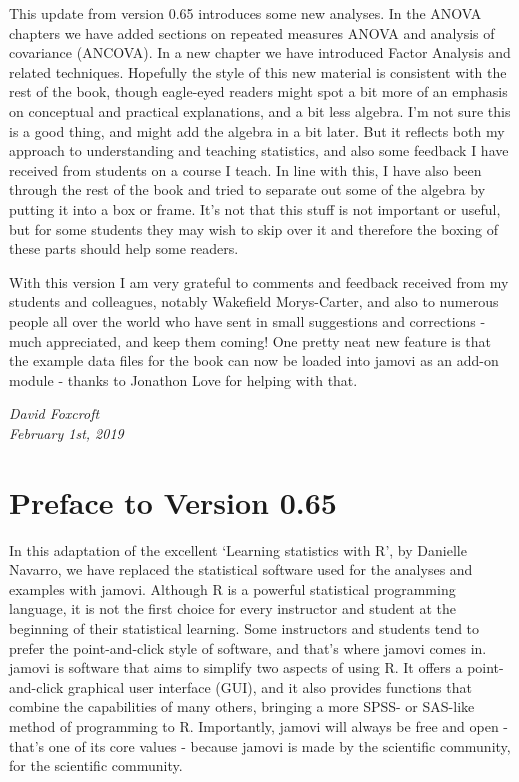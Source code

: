 \documentclass[
  letterpaper,
]{book}
\begin{document}
This update from version 0.65 introduces some new analyses. In the ANOVA
chapters we have added sections on repeated measures ANOVA and analysis
of covariance (ANCOVA). In a new chapter we have introduced Factor
Analysis and related techniques. Hopefully the style of this new
material is consistent with the rest of the book, though eagle-eyed
readers might spot a bit more of an emphasis on conceptual and practical
explanations, and a bit less algebra. I'm not sure this is a good thing,
and might add the algebra in a bit later. But it reflects both my
approach to understanding and teaching statistics, and also some
feedback I have received from students on a course I teach. In line with
this, I have also been through the rest of the book and tried to
separate out some of the algebra by putting it into a box or frame. It's
not that this stuff is not important or useful, but for some students
they may wish to skip over it and therefore the boxing of these parts
should help some readers.

With this version I am very grateful to comments and feedback received
from my students and colleagues, notably Wakefield Morys-Carter, and
also to numerous people all over the world who have sent in small
suggestions and corrections - much appreciated, and keep them coming!
One pretty neat new feature is that the example data files for the book
can now be loaded into jamovi as an add-on module - thanks to Jonathon
Love for helping with that.

\emph{David Foxcroft\\
February 1st, 2019}

\hypertarget{preface-to-version-0.65}{%
\section*{Preface to Version 0.65}\label{preface-to-version-0.65}}

In this adaptation of the excellent `Learning statistics with R', by
Danielle Navarro, we have replaced the statistical software used for the
analyses and examples with jamovi. Although R is a powerful statistical
programming language, it is not the first choice for every instructor
and student at the beginning of their statistical learning. Some
instructors and students tend to prefer the point-and-click style of
software, and that's where jamovi comes in. jamovi is software that aims
to simplify two aspects of using R. It offers a point-and-click
graphical user interface (GUI), and it also provides functions that
combine the capabilities of many others, bringing a more SPSS- or
SAS-like method of programming to R. Importantly, jamovi will always be
free and open - that's one of its core values - because jamovi is made
by the scientific community, for the scientific community.
\end{document}
